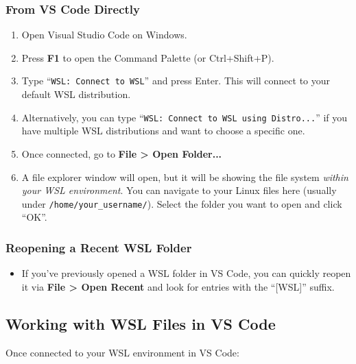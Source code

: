 \documentclass{article}
\begin{document}
\subsubsection{From VS Code Directly}
\begin{enumerate}
    \item Open Visual Studio Code on Windows.
    \item Press \textbf{F1} to open the Command Palette (or Ctrl+Shift+P).
    \item Type ``\texttt{WSL: Connect to WSL}'' and press Enter. This will connect to your default WSL distribution.
    \item Alternatively, you can type ``\texttt{WSL: Connect to WSL using Distro...}'' if you have multiple WSL distributions and want to choose a specific one.
    \item Once connected, go to \textbf{File \textgreater{} Open Folder...}
    \item A file explorer window will open, but it will be showing the file system \textit{within your WSL environment}. You can navigate to your Linux files here (usually under \texttt{/home/your\_username/}). Select the folder you want to open and click ``OK''.
\end{enumerate}

\subsubsection{Reopening a Recent WSL Folder}
\begin{itemize}
    \item If you've previously opened a WSL folder in VS Code, you can quickly reopen it via \textbf{File > Open Recent} and look for entries with the ``[WSL]'' suffix.
\end{itemize}

\subsection{Working with WSL Files in VS Code}

Once connected to your WSL environment in VS Code:
\end{document}
